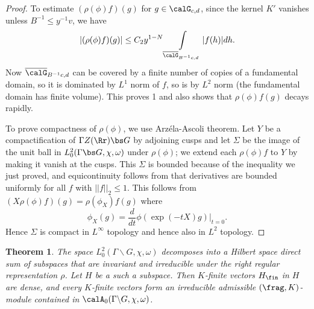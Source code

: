 \documentclass{article}
\newtheorem{theorem}{Theorem}[section]
\begin{document}
\begin{proof}
To estimate $(\rho(\phi)f)(g)$ for $g\in \calG_{c, d}$, since the kernel $K'$ vanishes unless $B^{-1}\leq y^{-1}v$, we have 
$$
|(\rho(\phi)f)(g)| \leq C_{2}y^{1-N} \int\limits_{\overline{\calG}_{B^{-1}c, d}}|f(h)| dh. 
$$
Now $\overline{\calG}_{B^{-1}c, d}$ can be covered by a finite number of copies of a fundamental domain, so it is dominated by $L^{1}$ norm of $f$, so is by $L^{2}$ norm (the fundamental domain has finite volume). 
This proves 1 and also shows that $\rho(\phi)f(g)$ decays rapidly. 

To prove compactness of $\rho(\phi)$, we use Arz\'ela-Ascoli theorem. Let $Y$ be a compactification of $\Gamma Z(\Rr) \bs G$ by adjoining cusps and let $\Sigma$ be the image of the unit ball in $L^{2}_{0}(\Gamma\bs G, \chi, \omega)$ under $\rho(\phi)$; we extend each $\rho(\phi)f$ to $Y$ by making it vanish at the cusps. This $\Sigma$ is bounded because of the inequality we just proved, and equicontinuity follows from that derivatives are bounded uniformly for all $f$ with $||f||_{2} \leq 1$. 
This follows from $(X\rho(\phi)f)(g) = \rho(\phi_{X})f(g)$ where 
$$
\phi_{X}(g) = \frac{d}{dt} \phi(\exp (-tX)g)|_{t=0}. 
$$
Hence $\Sigma$ is compact in $L^{\infty}$ topology and hence also in $L^{2}$ topology. 
\end{proof}
\begin{theorem}
\label{cuspdecom}
The space $L_{0}^{2}(\Gamma\backslash G, \chi, \omega)$ decomposes into a Hilbert space direct sum of subspaces that are invariant and irreducible under the right regular representation $\rho$. Let $H$ be a such a subspace. 
Then $K$-finite vectors $H_{\fin}$ in $H$ are dense, and every $K$-finite vectors form an irreducible admissible $(\frag, K)$-module contained in $\calA_{0}(\Gamma\backslash G, \chi, \omega)$. 
\end{theorem}
\end{document}
